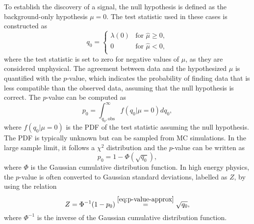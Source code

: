 To establish the discovery of a signal, the null hypothesis is defined as the background-only hypothesis $\mu = 0$.
The test statistic used in these cases is constructed as 
\begin{equation}
    q_0 =
     \begin{cases}
       \lambda(0) & \text{for } \hat{\mu} \ge 0, \\
       0 & \text{for } \hat{\mu} < 0,  \\
     \end{cases}
     \label{eq:q0}
  \end{equation}
where the test statistic is set to zero for negative values of $\mu$, as they are considered unphysical.
The agreement between data and the hypothesized $\mu$ is quantified with the $p$-value, which indicates the probability of finding data that is less compatible than the observed data, assuming that the null hypothesis is correct.
The $p$-value can be computed as
\begin{equation}
    \label{eq:p-value-discovery}
    p_0 = \int_{q_0, \text{obs}}^{\infty} f \left( q_0 | \mu = 0 \right) dq_0,
\end{equation}
where $f \left( q_0 | \mu = 0 \right)$ is the PDF of the test statistic assuming the null hypothesis.
The PDF is typically unknown but can be sampled from MC simulations. 
In the large sample limit, it follows a $\chi^2$ distribution and the $p$-value can be written as~\cite{Cowan:2010js}
\begin{equation}
    \label{eq:p-value-approx}
    p_0 = 1 - \Phi( \sqrt{q_0}),
\end{equation}
where $\Phi$ is the Gaussian cumulative distribution function. 
In high energy physics, the $p$-value is often converted to Gaussian standard deviations, labelled as $Z$, by using the relation
\begin{equation}
    \label{eq:Z0}
    Z = \Phi^{-1} ( 1 - p_0) \overset{\ref{eq:p-value-approx}}{=} \sqrt{q_0},
\end{equation}
where $\Phi^{-1}$ is the inverse of the Gaussian cumulative distribution function. 

